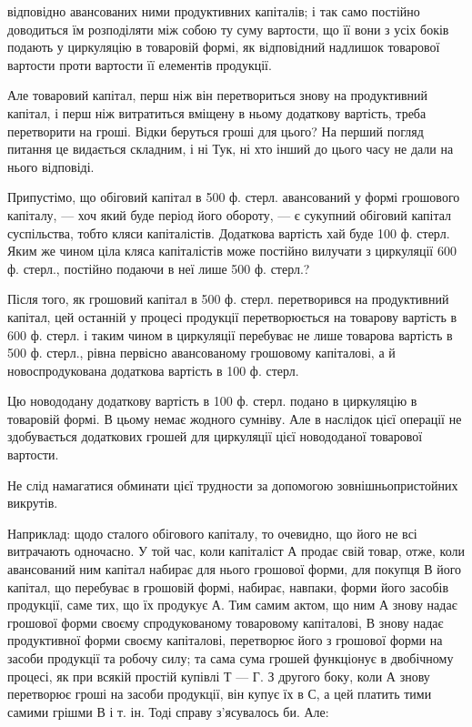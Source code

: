 \parcont{}  %
відповідно авансованих ними продуктивних капіталів; і так само постійно
доводиться їм розподіляти між собою ту суму вартости, що її вони
з усіх боків подають у циркуляцію в товаровій формі, як відповідний
надлишок товарової вартости проти вартости її елементів продукції.

Але товаровий капітал, перш ніж він перетвориться знову на продуктивний
капітал, і перш ніж витратиться вміщену в ньому додаткову
вартість, треба перетворити на гроші. Відки беруться гроші для цього?
На перший погляд питання це видається складним, і ні Тук, ні хто інший
до цього часу не дали на нього відповіді.

Припустімо, що обіговий капітал в 500 ф. стерл. авансований у формі
грошового капіталу, — хоч який буде період його обороту, — є сукупний
обіговий капітал суспільства, тобто кляси капіталістів. Додаткова вартість
хай буде 100 ф. стерл. Яким же чином ціла кляса капіталістів може постійно
вилучати з циркуляції 600 ф. стерл., постійно подаючи в неї
лише 500 ф. стерл.?

Після того, як грошовий капітал в 500 ф. стерл. перетворився на
продуктивний капітал, цей останній у процесі продукції перетворюється
на товарову вартість в 600 ф. стерл. і таким чином в циркуляції перебуває
не лише товарова вартість в 500 ф. стерл., рівна первісно авансованому
грошовому капіталові, а й новоспродукована додаткова
вартість в 100 ф. стерл.

Цю новододану додаткову вартість в 100 ф. стерл. подано в циркуляцію
в товаровій формі. В цьому немає жодного сумніву. Але в наслідок
цієї операції не здобувається додаткових грошей для циркуляції
цієї новододаної товарової вартости.

Не слід намагатися обминати цієї трудности за допомогою зовнішньопристойних
викрутів.

Наприклад: щодо сталого обігового капіталу, то очевидно, що його
не всі витрачають одночасно. У той час, коли капіталіст А продає
свій товар, отже, коли авансований ним капітал набирає для нього грошової
форми, для покупця В його капітал, що перебуває в грошовій
формі, набирає, навпаки, форми його засобів продукції, саме тих, що їх
продукує А. Тим самим актом, що ним А знову надає грошової форми
своєму спродукованому товаровому капіталові, В знову надає продуктивної
форми своєму капіталові, перетворює його з грошової форми на засоби
продукції та робочу силу; та сама сума грошей функціонує в двобічному
процесі, як при всякій простій купівлі Т — Г. З другого боку, коли
А знову перетворює гроші на засоби продукції, він купує їх в С, а
цей платить тими самими грішми В і т. ін. Тоді справу з’ясувалось би. Але:

